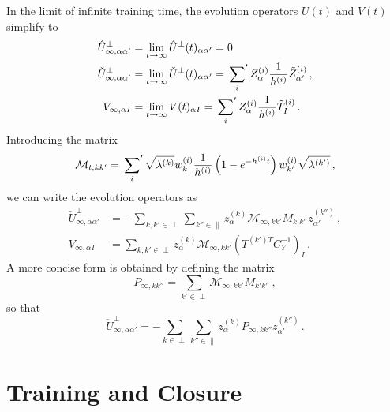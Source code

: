 \documentclass[11pt]{article}
\begin{document}
In the limit of infinite training time, the evolution operators $U(t)$ and $V(t)$ simplify to
\begin{align}
    \hat{U}^\perp_{\infty, \alpha\alpha'}
        &= \lim_{t\to\infty}\hat{U}^\perp(t)_{\alpha\alpha'} = 0\, \\
    \check{U}^\perp_{\infty,\alpha\alpha'}
        &= \lim_{t\to\infty}\check{U}^\perp(t)_{\alpha\alpha'}
            = \sideset{}{'}\sum_{i} Z^{(i)}_{\alpha} \frac{1}{h^{(i)}} \tilde{Z}^{(i)}_{\alpha'}\, , \\
    V_{\infty,\alpha I}
        &= \lim_{t\to\infty}V(t)_{\alpha I}
            = \sideset{}{'}\sum_{i} Z^{(i)}_{\alpha} \frac{1}{h^{(i)}} \tilde{T}^{(i)}_{I}\, .
\end{align}
Introducing the matrix
\begin{align}
    \label{eq:calMDef}
    \mathcal{M}_{t,kk'}
        = \sideset{}{'}\sum_{i} \sqrt{\lambda^{(k)}} w^{(i)}_{k} \frac{1}{h^{(i)}}
            \left(1 - e^{-h^{(i)}t}\right) w^{(i)}_{k'} \sqrt{\lambda^{(k')}} \, ,
\end{align}
we can write the evolution operators as
\begin{align}
    \label{eq:UcheckInfty}
    \check{U}^\perp_{\infty,\alpha\alpha'}
        &= -\sum_{k,k'\in\perp} \sum_{k''\in\parallel} z^{(k)}_{\alpha} \mathcal{M}_{\infty,kk'} M_{k'k''} z^{(k'')}_{\alpha'}\, , \\
    \label{eq:VInfty}
    V_{\infty, \alpha I}
        &= \sum_{k,k'\in\perp} z^{(k)}_{\alpha} \mathcal{M}_{\infty,kk'}
            \left(T^{(k') T} C_{Y}^{-1}\right)_I \, .
\end{align}
A more concise form is obtained by defining the matrix
\begin{equation}
    \label{eq:PInftyDef}
    P_{\infty,kk''} = \sum_{k'\in\perp} \mathcal{M}_{\infty,kk'} M_{k'k''}\, ,
\end{equation}
so that
\begin{equation}
    \label{eq:UcheckInftyV2}
    \check{U}^\perp_{\infty,\alpha\alpha'} = -\sum_{k\in\perp} \sum_{k''\in\parallel} z^{(k)}_{\alpha} P_{\infty,kk''} z^{(k'')}_{\alpha'}\, .
\end{equation}


\newpage


\section{Training and Closure}
\end{document}
